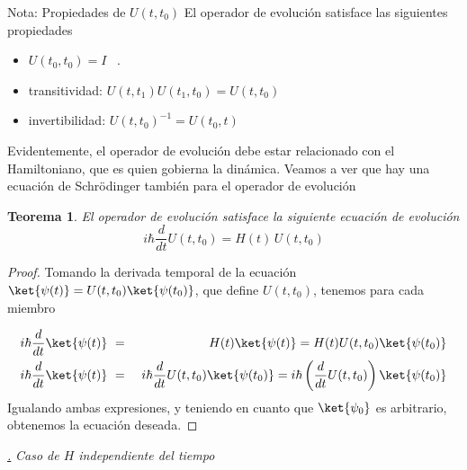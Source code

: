\documentclass[a4paper,11pt]{book} %
\newtheorem{teorema_contador}{Teorema}
\newcommand{\Teorema}[1]{
		\begin{mybox_gray2}{}
			\begin{teorema_contador}
				 #1 
			\end{teorema_contador} 
		\end{mybox_gray2}
	}
\numberwithin{equation}{chapter}
\def\subsubiContadorIt{\par\addtocounter{subsubsection}{1}\underline{\it\thesubsubsection.}\hskip0.5cm \setcounter{subsubsubsectionIt}{0}}
\newcommand{\SubsubiIt}[1]{
		\subsubiContadorIt \textit{#1}
	}
\newcounter{subsubsubsectionIt}[subsubsection]
\begin{document}
\begin{mybox_blue}{Nota: Propiedades de ${U(t,t_0)}$}
El operador de evolución satisface las siguientes propiedades
\begin{itemize}
	\item $U(t_0,t_0) = I$ \, .
	\item transitividad:  $U(t,t_1)U(t_1,t_0)= U(t,t_0)$
	\item invertibilidad: $U(t,t_0)^{-1} = U(t_0,t)$
\end{itemize}
\end{mybox_blue}

Evidentemente, el operador de evolución debe estar relacionado con el Hamiltoniano, que es quien gobierna la dinámica. Veamos a ver que hay una ecuación de Schrödinger también para el operador de evolución

	\Teorema{
	El operador de evolución satisface la siguiente ecuación de evolución
		\begin{equation}
		i \hbar \frac{d}{dt}U(t,t_0) = H(t)\, U(t,t_0)
		\end{equation}
	}
\begin{proof}
Tomando la derivada temporal de la ecuación $\ket{\psi(t)} = U(t,t_0)\ket{\psi(t_0)}$, que define $U(t,t_0)$, tenemos para cada miembro

\begin{eqnarray}
i \hbar \frac{d}{dt}\ket{\psi(t)} &~=~&   H(t)\ket{\psi(t)} =  H(t)U(t,t_0)\ket{\psi(t_0)}  \nonumber\\
i \hbar \frac{d}{dt}\ket{\psi(t)} &~=~& i \hbar \frac{d}{dt}U(t,t_0)\ket{\psi(t_0)} = i \hbar \left(\frac{d}{dt}U(t,t_0)\right)\ket{\psi(t_0)}
\end{eqnarray}
Igualando ambas expresiones, y teniendo en cuanto que $\ket{\psi_0}$ es arbitrario, obtenemos la ecuación deseada.
\end{proof}



		\SubsubiIt{Caso de $H$ independiente del tiempo}
\end{document}
